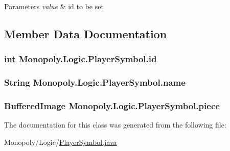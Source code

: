 \begin{DoxyParams}{Parameters}
{\em value} & id to be set \\
\hline
\end{DoxyParams}


\subsection{Member Data Documentation}
\subsubsection[{\texorpdfstring{id}{id}}]{\setlength{\rightskip}{0pt plus 5cm}int Monopoly.\+Logic.\+Player\+Symbol.\+id\hspace{0.3cm}{\ttfamily [private]}}\hypertarget{class_monopoly_1_1_logic_1_1_player_symbol_a45aa6d7ff0270887786b59b8a23f9f42}{}\label{class_monopoly_1_1_logic_1_1_player_symbol_a45aa6d7ff0270887786b59b8a23f9f42}
\subsubsection[{\texorpdfstring{name}{name}}]{\setlength{\rightskip}{0pt plus 5cm}String Monopoly.\+Logic.\+Player\+Symbol.\+name\hspace{0.3cm}{\ttfamily [private]}}\hypertarget{class_monopoly_1_1_logic_1_1_player_symbol_accd42c0b122203741494190e7b3aa9f0}{}\label{class_monopoly_1_1_logic_1_1_player_symbol_accd42c0b122203741494190e7b3aa9f0}
\subsubsection[{\texorpdfstring{piece}{piece}}]{\setlength{\rightskip}{0pt plus 5cm}Buffered\+Image Monopoly.\+Logic.\+Player\+Symbol.\+piece\hspace{0.3cm}{\ttfamily [private]}}\hypertarget{class_monopoly_1_1_logic_1_1_player_symbol_a4ee52adad6ccb63070f253641c27700e}{}\label{class_monopoly_1_1_logic_1_1_player_symbol_a4ee52adad6ccb63070f253641c27700e}


The documentation for this class was generated from the following file\+:\begin{DoxyCompactItemize}
\item 
Monopoly/\+Logic/\hyperlink{_player_symbol_8java}{Player\+Symbol.\+java}\end{DoxyCompactItemize}
